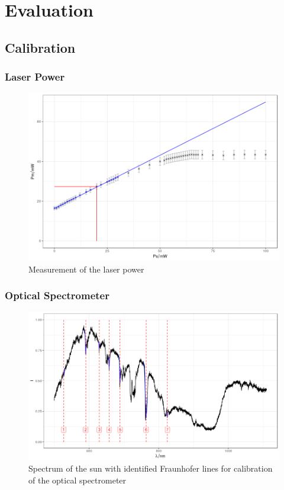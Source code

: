 \section{Evaluation}
\subsection{Calibration}
\subsubsection{Laser Power}

\begin{figure}
	\centering
	\includegraphics[width=\textwidth]{../figures/powercal.png}
	\caption{Measurement of the laser power}
	\label{fig:power}
\end{figure}

\subsubsection{Optical Spectrometer}
\begin{figure}
	\centering
	\includegraphics[width=\textwidth]{../figures/sunspectrum.png}
	\caption[Spectrum of the sun with identified Fraunhofer lines]{Spectrum of the sun with identified Fraunhofer lines for calibration of the optical spectrometer}
	\label{fig:sunspectrum}
\end{figure}

